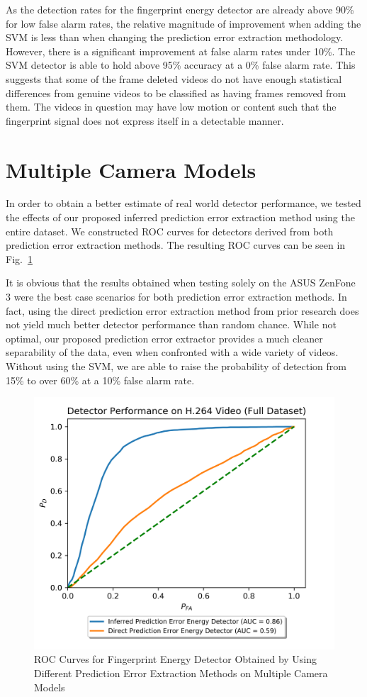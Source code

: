 As the detection rates for the fingerprint energy detector are already above 90\% for low false alarm rates, the relative magnitude of improvement when adding the SVM is less than when changing the prediction error extraction methodology. However, there is a significant improvement at false alarm rates under 10\%. The SVM detector is able to hold above 95\% accuracy at a 0\% false alarm rate. This suggests that some of the frame deleted videos do not have enough statistical differences from genuine videos to be classified as having frames removed from them. The videos in question may have low motion or content such that the fingerprint signal does not express itself in a detectable manner.

\section{Multiple Camera Models}

In order to obtain a better estimate of real world detector performance, we tested the effects of our proposed inferred prediction error extraction method using the entire dataset. We constructed ROC curves for detectors derived from both prediction error extraction methods. The resulting ROC curves can be seen in Fig.~\ref{perrorExtractFullDS}

It is obvious that the results obtained when testing solely on the ASUS ZenFone 3 were the best case scenarios for both prediction error extraction methods. In fact, using the direct prediction error extraction method from prior research does not yield much better detector performance than random chance. While not optimal, our proposed prediction error extractor provides a much cleaner separability of the data, even when confronted with a wide variety of videos. Without using the SVM, we are able to raise the probability of detection from 15\% to over 60\% at a 10\% false alarm rate.
%
\begin{figure}[htbp]
\centerline{\includegraphics[width=0.7\linewidth]{ExperimentalResults/new_perror_extract_roc_full_ds.png}}
\caption{ROC Curves for Fingerprint Energy Detector Obtained by Using Different Prediction Error Extraction Methods on Multiple Camera Models}
\label{perrorExtractFullDS}
\end{figure} 

